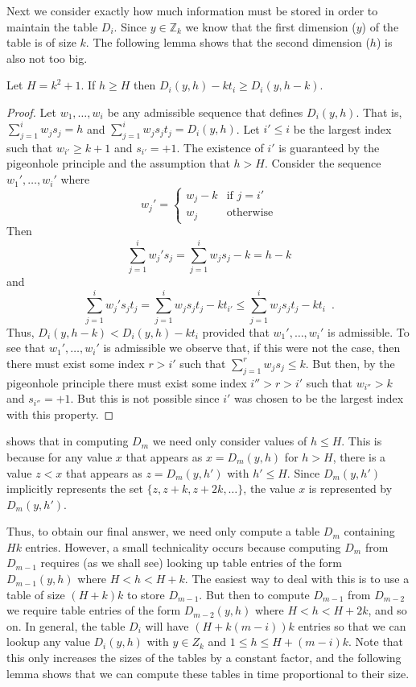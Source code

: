 \documentclass[11pt]{patmorin}
\begin{document}
Next we consider exactly how much information must be stored in order
to maintain the table $D_i$. Since $y\in \mathbb{Z}_k$ we know that
the first dimension ($y$) of the table is of size $k$. The following
lemma shows that the second dimension ($h$) is also not too big.

\begin{lem}
Let $H=k^2+1$.  If $h\ge H$ then $D_i(y,h) - kt_i \ge D_i(y,h-k)$.
\end{lem}

\begin{proof}
Let $w_1,\ldots,w_i$ be any admissible sequence that defines
$D_i(y,h)$.  That is,  $\sum_{j=1}^iw_js_j = h$ and $\sum_{j=1}^i w_js_jt_j
= D_i(y,h)$.  Let $i'\le i$ be the largest index such that
$w_{i'}\ge k+1$ and $s_{i'}=+1$.  The existence of $i'$ is guaranteed
by the pigeonhole principle and the
assumption that $h>H$.  Consider the sequence $w_1',\ldots,w_i'$ where
\[
     w_j' = \left\{ \begin{array}{ll}
            w_j-k & \mbox{if $j=i'$} \\
            w_j & \mbox{otherwise}  \end{array} \right.
\]
Then
\[
  \sum_{j=1}^i w_j's_j = \sum_{j=1}^i w_js_j - k = h-k
\]
and
\[
   \sum_{j=1}^i w_j's_jt_j = \sum_{j=1}^i w_js_jt_j - kt_{i'} 
    \le \sum_{j=1}^i w_js_jt_j - kt_{i} \enspace . 
\]
Thus, $D_i(y,h-k) < D_i(y,h) - kt_i$ provided that $w_1',\ldots,w_i'$
is admissible.  To see that $w_1',\ldots,w_i'$ is admissible we
observe that, if this were not the case, then there must exist some
index $r>i'$ such that $\sum_{j=1}^r w_js_j \le k$.  But then, by the
pigeonhole principle there
must exist some index $i''>r>i'$ such that $w_{i''}>k$ and
$s_{i''}=+1$.  But this is not possible since $i'$ was chosen to be
the largest index with this property.
\end{proof}

 shows that in computing $D_m$ we need only consider
values of $h\le H$.  This is because for any value $x$ that appears as
$x=D_m(y,h)$ for $h>H$, there is a value $z< x$ that appears as
$z=D_m(y,h')$ with $h'\le H$.  Since $D_m(y,h')$ implicitly represents the
set $\{z, z+k, z+2k,\ldots\}$, the value $x$ is represented by
$D_m(y,h')$.

Thus, to obtain our final answer, we need only compute a
table $D_m$ containing $Hk$ entries.  However, a small technicality
occurs because computing $D_m$ from $D_{m-1}$ requires (as we shall
see) looking up table entries of the form $D_{m-1}(y,h)$ where
$H<h<H+k$.  The easiest way to deal with this is to use a table of
size $(H+k)k$ to store $D_{m-1}$.  But then to compute $D_{m-1}$ from
$D_{m-2}$ we require table entries of the form $D_{m-2}(y,h)$ where
$H<h<H+2k$, and so on.  In general, the table $D_i$ will have
$(H+k(m-i))k$ entries so that we can lookup any value $D_i(y,h)$ with
$y\in Z_k$ and $1\le h\le H+(m-i)k$.  Note that this only increases
the sizes of the tables by a constant factor, and the following lemma
shows that we can compute these tables in time proportional to their
size.
\end{document}
